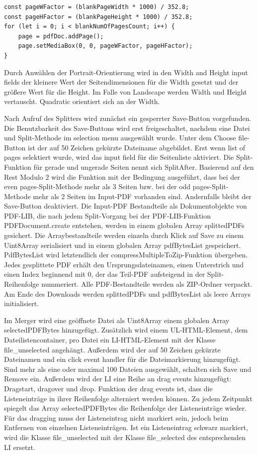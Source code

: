 \begin{lstlisting}[style=ES6, caption={Berechnung der PDF-Seitengröße}, label=code:mediabox, breaklines=true]
const pageWFactor = (blankPageWidth * 1000) / 352.8;
const pageHFactor = (blankPageHeight * 1000) / 352.8;
for (let i = 0; i < blankNumOfPagesCount; i++) {
	page = pdfDoc.addPage();
	page.setMediaBox(0, 0, pageWFactor, pageHFactor);
}
\end{lstlisting} 

Durch Anwählen der Portrait-Orientierung wird in den Width and Height input fields der kleinere Wert der Seitendimensionen für die Width gesetzt und der größere Wert für die Height. Im Falle von Landscape werden Width und Height vertauscht. Quadratic orientiert sich an der Width.
\par
Nach Aufruf des Splitters wird zunächst ein gesperrter Save-Button vorgefunden. Die Benutzbarkeit des Save-Buttons wird erst freigeschaltet, nachdem eine Datei und Split-Methode im selection menu ausgewählt wurde. Unter dem Choose file-Button ist der auf 50 Zeichen gekürzte Dateiname abgebildet. Erst wenn list of pages selektiert wurde, wird das input field für die Seitenliste aktiviert. Die Split-Funktion für gerade und ungerade Seiten nennt sich SplitAfter. Basierend auf den Rest Modulo 2 wird die Funktion mit der Bedingung ausgeführt, dass bei der even pages-Split-Methode mehr als 3 Seiten bzw. bei der odd pages-Split-Methode mehr als 2 Seiten im Input-PDF vorhanden sind. Andernfalls bleibt der Save-Button deaktiviert. Die Input-PDF Bestandteile als Dokumentobjekte von PDF-LIB, die nach jedem Split-Vorgang bei der PDF-LIB-Funktion PDFDocument.create entstehen, werden in einem globalen Array splittedPDFs gesichert. Die Arraybestandteile werden einzeln durch Klick auf Save zu einem Uint8Array serialisiert und in einem globalen Array pdfBytesList gespeichert. PdfBytesList wird letztendlich der compressMultipleToZip-Funktion übergeben. Jedes gesplittete PDF erhält den Ursprungsdateinamen, einen Unterstrich und einen Index beginnend mit 0, der das Teil-PDF aufsteigend in der Split-Reihenfolge nummeriert. Alle PDF-Bestandteile werden als ZIP-Ordner verpackt. Am Ende des Downloads werden splittedPDFs und pdfBytesList als leere Arrays initialisiert.
\par
Im Merger wird eine geöffnete Datei als Uint8Array einem globalen Array selectedPDFBytes hinzugefügt. Zusätzlich wird einem UL-HTML-Element, dem Dateilistencontainer, pro Datei ein LI-HTML-Element mit der Klasse file\_unselected angehängt. Außerdem wird der auf 50 Zeichen gekürzte Dateinamen und ein click event handler für die Dateimarkierung hinzugefügt. Sind mehr als eine oder maximal 100 Dateien ausgewählt, schalten sich Save und Remove ein. Außerdem wird der LI eine Reihe an drag events hinzugefügt: Dragstart, dragover und drop. Funktion der drag events ist, dass die Listeneinträge in ihrer Reihenfolge alterniert werden können. Zu jedem Zeitpunkt spiegelt das Array selectedPDFBytes die Reihenfolge der Listeneinträge wieder. Für das dragging muss der Listeneintrag nicht markiert sein, jedoch beim Entfernen von einzelnen Listeneinträgen. Ist ein Listeneintrag schwarz markiert, wird die Klasse file\_unselected mit der Klasse file\_selected des entsprechenden LI ersetzt.

